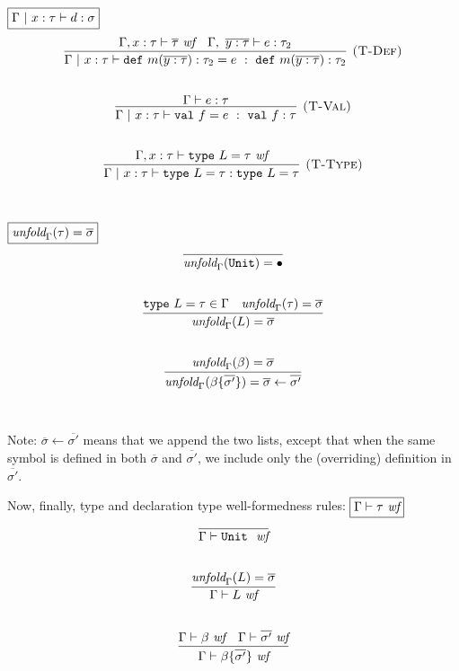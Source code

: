 \documentclass{article}
\newcommand{\keywadj}[1]{\mathtt{#1}}
\newcommand{\keyw}[1]{\keywadj{#1}~}
\begin{document}
$\fbox{$\Gamma ~|~ x:\tau \vdash d : \sigma$}$
\[
\begin{array}{c}
\infer[\textsc{(T-Def)}]
  {\Gamma  ~|~ x:\tau \vdash \keyw{def} m(\overline{y : \tau}) : \tau_2 = e~:~\keyw{def} m(\overline{y : \tau}) : \tau_2}
  {\Gamma, x:\tau \vdash \overline{\tau}~\textit{wf} & \Gamma,~\overline{y : \tau} \vdash e : \tau_2}\\[5ex]

\infer[\textsc{(T-Val)}]
  {\Gamma ~|~ x:\tau \vdash \keyw{val} f = e~:~\keyw{val} f : \tau}
  {\Gamma \vdash e : \tau}\\[5ex]

\infer[\textsc{(T-Type)}]
  {\Gamma ~|~ x:\tau \vdash \keyw{type} L = \tau : \keyw{type} L = \tau}
  {\Gamma, x:\tau \vdash \keyw{type} L = \tau~\textit{wf}}\\[5ex]

\end{array}
\]

$\fbox{$\textit{unfold}_\Gamma(\tau) = \overline{\sigma}$}$
\[
\begin{array}{c}

\infer
  {\textit{unfold}_\Gamma(\keywadj{Unit}) = \bullet}
  {}\\[5ex]
  
\infer
  {\textit{unfold}_\Gamma(L) = \overline{\sigma}}
  {\keyw{type} L = \tau \in \Gamma & \textit{unfold}_\Gamma(\tau) = \overline{\sigma}}\\[5ex]
  
\infer
  {\textit{unfold}_\Gamma(\beta \{\overline{\sigma'}\}) = \overline{\sigma} \leftarrow \overline{\sigma'}}
  {\textit{unfold}_\Gamma(\beta) = \overline{\sigma}}\\[5ex]
  
\end{array}
\]

Note: $\overline{\sigma} \leftarrow \overline{\sigma'}$ means that we append the two lists, except that when the same symbol is defined in both $\overline{\sigma}$ and $\overline{\sigma'}$, we include only the (overriding) definition in $\overline{\sigma'}$.

Now, finally, type and declaration type well-formedness rules:
$\fbox{$\Gamma \vdash \tau~\textit{wf}$}$
\[
\begin{array}{c}
\infer
  {\Gamma \vdash \keyw{Unit}~\textit{wf}}
  {}\\[5ex]

\infer
  {\Gamma \vdash L~\textit{wf}}
  {\textit{unfold}_\Gamma(L) = \overline{\sigma}}\\[5ex]

\infer
  {\Gamma \vdash \beta \{\overline{\sigma'}\}~\textit{wf}}
  {\Gamma \vdash \beta ~\textit{wf} & \Gamma \vdash \overline{\sigma'}~\textit{wf}}\\[5ex]

\end{array}
\]
\end{document}
